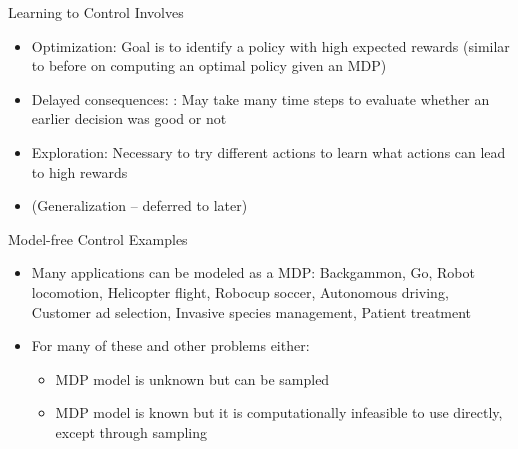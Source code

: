 \begin{frame}[c]{Learning to Control Involves}
	
	\begin{itemize}
		\item Optimization: Goal is to identify a policy with high expected rewards (similar to before on computing an optimal policy \alert{given} an MDP)
		\item Delayed consequences: : May take many time steps to evaluate whether an earlier decision was good or not
		\item Exploration: Necessary to try different actions to learn what actions can lead to high rewards
		\item (Generalization -- deferred to later)
	\end{itemize}
	
\end{frame}
\begin{frame}[c]{Model-free Control Examples}
	
	\begin{itemize}¸
		\item Many applications can be modeled as a MDP: Backgammon, Go, Robot locomotion, Helicopter flight, Robocup soccer, Autonomous driving, Customer ad selection, Invasive species management, Patient
		treatment
		\item For many of these and other problems either:
		\begin{itemize}
			\item MDP model is unknown but can be sampled
			\item MDP model is known but it is computationally infeasible to use directly, except through sampling
		\end{itemize}
	\end{itemize}
	
\end{frame}
